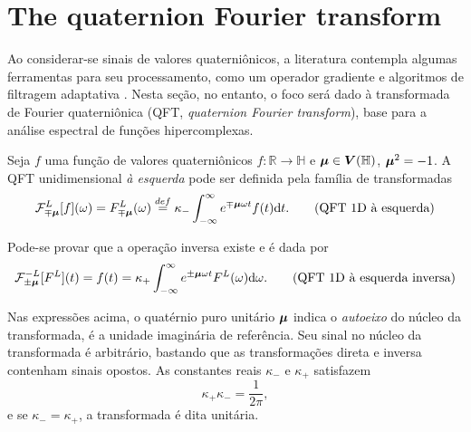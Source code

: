 \section{The quaternion Fourier transform}
\label{sec:QFT}

Ao considerar-se sinais de valores quaterni\^onicos, a literatura contempla algumas ferramentas para seu processamento, como um operador gradiente \cite{jiang2014general} e algoritmos de filtragem adaptativa \cite{jiang2013frequency}. Nesta se\c c\~ao, no entanto, o foco ser\'a dado \`a transformada de Fourier quaterni\^onica (QFT, \emph{quaternion Fourier transform}), base para a an\'alise espectral de fun\c c\~oes hipercomplexas.

Seja $f$ uma fun\c c\~ao de valores quaterni\^onicos $f: \mathbb{R} \rightarrow \mathbb{H}$ e $\boldsymbol{\mu} \in \boldsymbol{V}(\mathbb{H})$, $\boldsymbol{\mu}^2 = -1$. A QFT unidimensional \emph{\`a esquerda} pode ser definida pela fam\'ilia de transformadas
\begin{equation}
\mathcal{F}^L_{\mp \boldsymbol{\mu}}[f](\omega) = 
F^L_{\mp \boldsymbol{\mu}}(\omega) \overset{def}{=}
\kappa_{-} \int_{-\infty}^{\infty} e^{\mp \boldsymbol{\mu} \omega t} f(t) \mathrm{d}t.
\tag{QFT 1D \`a esquerda}
\end{equation}

Pode-se provar que a opera\c c\~ao inversa existe e \'e dada por
\begin{equation}
\mathcal{F}^{-L}_{\pm \boldsymbol{\mu}}[F^L](t) = 
f(t) =
\kappa_{+} \int_{-\infty}^{\infty} e^{\pm \boldsymbol{\mu} \omega t} F^L(\omega) \mathrm{d}\omega.
\tag{QFT 1D \`a esquerda inversa}
\end{equation}

Nas express\~oes acima, o quat\'ernio puro unit\'ario $\boldsymbol{\mu}$ indica o \emph{autoeixo} do n\'ucleo da transformada, \'e a unidade imagin\'aria de refer\^encia. Seu sinal no n\'ucleo da transformada \'e arbitr\'ario, bastando que as transforma\c c\~oes direta e inversa contenham sinais opostos. As constantes reais $\kappa_{-}$ e $\kappa_{+}$ satisfazem
\begin{equation}
\kappa_{+} \kappa_{-} = \frac{1}{2\pi},
\end{equation}
\noindent e se $\kappa_{-} = \kappa_{+}$, a transformada \'e dita unit\'aria.

